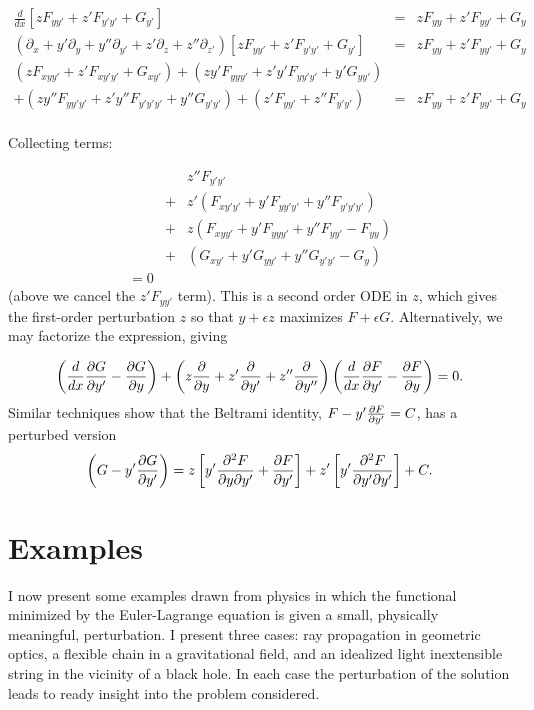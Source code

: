 \documentclass[pdflatex,sn-mathphys-num]{sn-jnl}%
\theoremstyle{thmstyleone}%
\theoremstyle{thmstyletwo}%
\theoremstyle{thmstylethree}%
\begin{document}
\begin{eqnarray}
\frac{d}{dx}\left[zF_{yy'} + z'F_{y'y'} + G_{y'}\right]
&=& zF_{yy} + z'F_{yy'} + G_{y}\nonumber\\
\left(\partial_{x} + y'\partial_{y} + y''\partial_{y'} + z'\partial_{z} + z''\partial_{z'}\right)
\left[zF_{yy'} + z'F_{y'y'} + G_{y'}\right]
&=& zF_{yy} + z'F_{yy'} + G_{y}\nonumber\\
(zF_{xyy'} + z'F_{xy'y'} + G_{xy'})
+ (zy'F_{yyy'} + z'y'F_{yy'y'} + y'G_{yy'})\nonumber\\
+ ( zy''F_{yy'y'} + z'y''F_{y'y'y'} + y''G_{y'y'})
+ (z'F_{yy'} + z''F_{y'y'})
&=& zF_{yy} + z'F_{yy'} + G_{y}\nonumber\\
\end{eqnarray}

Collecting terms:

\begin{eqnarray}
&{}& z''F_{y'y'}\nonumber\\
&+& z'(F_{xy'y'} + y'F_{yy'y'} + y''F_{y'y'y'})\nonumber\\
&+& z (F_{xyy'} + y'F_{yyy'} + y''F_{yy'}-F_{yy})\nonumber\\
&+& (G_{xy'} + y'G_{yy'} + y''G_{y'y'}- G_{y})\nonumber\\
= 0
\end{eqnarray}
%
(above we cancel the $z'F_{yy'}$ term). This is a second order ODE in
$z$, which gives the first-order perturbation $z$ so that $y+\epsilon
z$ maximizes $F+\epsilon G$.  Alternatively, we may factorize the
expression, giving

\begin{equation}\label{factorized_eqn}
\left(\frac{d}{dx}\frac{\partial{G}}{\partial{y'}} - \frac{\partial{G}}{\partial{y}}\right) + \left(z\frac{\partial{}}{\partial{y}} + z'\frac{\partial{}}{\partial{y'}} + z''\frac{\partial{}}{\partial{y''}}\right)
\left(\frac{d}{dx}\frac{\partial{F}}{\partial{y'}} - \frac{\partial{F}}{\partial{y}}\right)=0.
\end{equation}
%
Similar techniques show that the Beltrami identity,
$F-y'\frac{\partial{F}}{\partial{y'}}=C$, has a perturbed version
%
\begin{equation}\label{beltrami}
  \left(G-y'\frac{\partial{G}}{\partial{y'}}\right)
  =
    z \left[y'\frac{\partial^2F}{\partial y\partial y'} + \frac{\partial{F}}{\partial{y'}}\right]
  + z'\left[y'\frac{\partial^2F}{\partial y'\partial y'}\right] + C.
\end{equation}

\section{Examples}

I now present some examples drawn from physics in which the functional
minimized by the Euler-Lagrange equation is given a small, physically
meaningful, perturbation.  I present three cases: ray propagation in
geometric optics, a flexible chain in a gravitational field, and an
idealized light inextensible string in the vicinity of a black hole.
In each case the perturbation of the solution leads to ready insight
into the problem considered.
\end{document}
